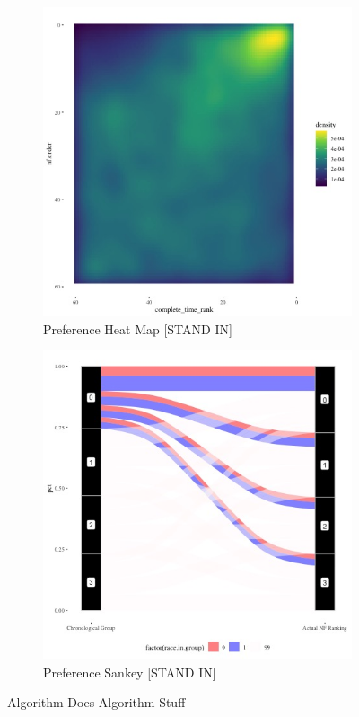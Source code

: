 \documentclass[12pt,letterpaper]{article}
\begin{document}
\begin{figure}[ht]
        \label{fig:fig}
   \begin{subfigure}{.5\textwidth} %
        \centering
        \includegraphics[width=.9\linewidth]{Output/Graphs/Audit/Heatmaps/US NF chron rank by nf rank - smooth.jpg}  %
        \caption{Preference Heat Map [STAND IN]}
        \label{fig:sub-first}
        \end{subfigure}
    \begin{subfigure}{.5\textwidth}
        \centering
        \includegraphics[width=.9\linewidth]{Output/Graphs/Audit/Sankey flows/US NF chronology to actual by ingroup.jpg}  
        \caption{Preference Sankey [STAND IN]}
        \label{fig:sub-second}
    \end{subfigure}
\caption{Algorithm Does Algorithm Stuff}
\end{figure}
\end{document}
